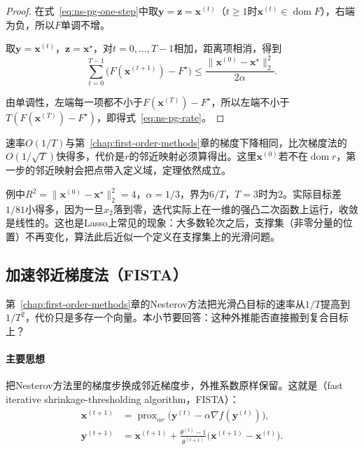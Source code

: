 \begin{proof}
在式~\eqref{eq:ns-pg-one-step}中取$\bm{y}=\bm{z}=\bm{x}^{(t)}$（$t\geq1$时$\bm{x}^{(t)}\in\operatorname{dom}F$），右端为负，所以$F$单调不增。

取$\bm{y}=\bm{x}^{(t)}$，$\bm{z}=\bm{x}^\star$，对$t=0,\ldots,T-1$相加，距离项相消，得到
\[
 \sum_{t=0}^{T-1}\bigl(F(\bm{x}^{(t+1)})-F^\star\bigr)\leq\frac{\lVert\bm{x}^{(0)}-\bm{x}^\star\rVert_2^2}{2\alpha}.
\]

由单调性，左端每一项都不小于$F(\bm{x}^{(T)})-F^\star$，所以左端不小于$T(F(\bm{x}^{(T)})-F^\star)$，即得式~\eqref{eq:ns-pg-rate}。
\end{proof}

速率$O(1/T)$与第~\ref{chap:first-order-methods}章的梯度下降相同，比次梯度法的$O(1/\sqrt{T})$快得多，代价是$r$的邻近映射必须算得出。这里$\bm{x}^{(0)}$若不在$\operatorname{dom}r$，第一步的邻近映射会把点带入定义域，定理依然成立。

例中$R^2=\lVert\bm{x}^{(0)}-\bm{x}^\star\rVert_2^2=4$，$\alpha=1/3$，界为$6/T$，$T=3$时为$2$。实际目标差$1/81$小得多，因为一旦$x_2$落到零，迭代实际上在一维的强凸二次函数上运行，收敛是线性的。这也是Lasso上常见的现象：大多数轮次之后，支撑集（非零分量的位置）不再变化，算法此后近似一个定义在支撑集上的光滑问题。

\subsection{加速邻近梯度法（FISTA）}
\label{sec:ns-fista}

第~\ref{chap:first-order-methods}章的Nesterov方法把光滑凸目标的速率从$1/T$提高到$1/T^2$，代价只是多存一个向量。本小节要回答：这种外推能否直接搬到复合目标上？

\paragraph{主要思想}
把Nesterov方法里的梯度步换成邻近梯度步，外推系数原样保留。这就是（fast iterative shrinkage-thresholding algorithm，FISTA）：
\begin{equation}
 \begin{aligned}
 \bm{x}^{(t+1)}&=\operatorname{prox}_{\alpha r}\bigl(\bm{y}^{(t)}-\alpha\nabla f(\bm{y}^{(t)})\bigr),\\
 \bm{y}^{(t+1)}&=\bm{x}^{(t+1)}+\frac{\theta^{(t)}-1}{\theta^{(t+1)}}\bigl(\bm{x}^{(t+1)}-\bm{x}^{(t)}\bigr).
 \end{aligned}
 \label{eq:ns-fista}
\end{equation}

